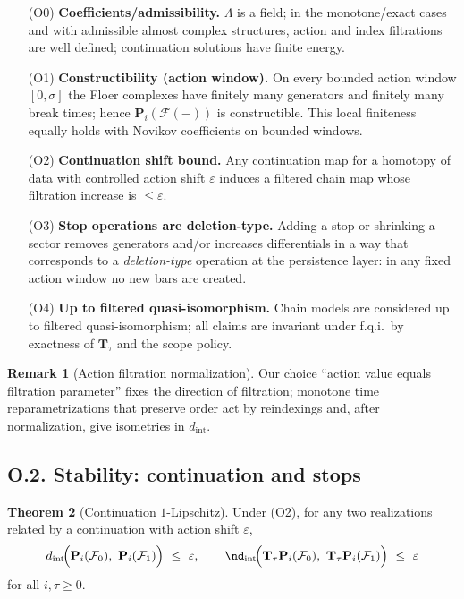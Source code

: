 \documentclass[11pt]{article}
\numberwithin{equation}{section}
\theoremstyle{plain}
\theoremstyle{definition}
\theoremstyle{remark}
\DeclareRobustCommand{\hyp}{\nobreakdash-}
\theoremstyle{plain}
\theoremstyle{definition}
\numberwithin{equation}{section}
\newtheorem{theorem}{Theorem}[section]
\theoremstyle{definition}
\newtheorem{remark}[theorem]{Remark}
\numberwithin{equation}{section}
\theoremstyle{plain}
\theoremstyle{definition}
\theoremstyle{remark}
\begin{document}
\begin{itemize}\setlength{\itemsep}{0.35em}
  \item[(O0)] \textbf{Coefficients/admissibility.} \(\Lambda\) is a field; in the monotone/exact cases and with admissible almost complex structures, action and index filtrations are well defined; continuation solutions have finite energy.

  \item[(O1)] \textbf{Constructibility (action window).} On every bounded action window \([0,\sigma]\) the Floer complexes have finitely many generators and finitely many break times; hence \(\mathbf{P}_i(\mathcal{F}(-))\) is constructible. This local finiteness equally holds with Novikov coefficients on bounded windows.

  \item[(O2)] \textbf{Continuation shift bound.} Any continuation map for a homotopy of data with controlled action shift \(\varepsilon\) induces a filtered chain map whose filtration increase is \(\le \varepsilon\).

  \item[(O3)] \textbf{Stop operations are deletion-type.} Adding a stop or shrinking a sector removes generators and/or increases differentials in a way that corresponds to a \emph{deletion-type} operation at the persistence layer: in any fixed action window no new bars are created.

  \item[(O4)] \textbf{Up to filtered quasi-isomorphism.} Chain models are considered up to filtered quasi-isomorphism; all claims are invariant under f.q.i.\ by exactness of \(\mathbf{T}_\tau\) and the scope policy.
\end{itemize}

\begin{remark}[Action filtration normalization]
Our choice “action value equals filtration parameter” fixes the direction of filtration; monotone time reparametrizations that preserve order act by reindexings and, after normalization, give isometries in \(d_{\mathrm{int}}\).
\end{remark}

\subsection*{O.2. Stability: continuation and stops}
\begin{theorem}[Continuation \(1\)\hyp Lipschitz]\label{O:thm:cont}
Under \textup{(O2)}, for any two realizations related by a continuation with action shift \(\varepsilon\),
\[
d_{\mathrm{int}}\!\Big(\mathbf{P}_i(\mathcal{F}_0),\ \mathbf{P}_i(\mathcal{F}_1)\Big)\ \le\ \varepsilon,\qquad\nd_{\mathrm{int}}\!\Big(\mathbf{T}_\tau\mathbf{P}_i(\mathcal{F}_0),\ \mathbf{T}_\tau\mathbf{P}_i(\mathcal{F}_1)\Big)\ \le\ \varepsilon
\]
for all \(i,\tau\ge 0\).
\end{theorem}
\end{document}
